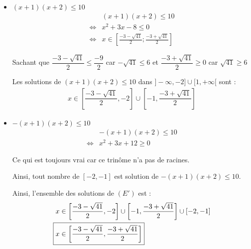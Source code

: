 \begin{exercice}
\begin{itemize}
    \item $(x+1)(x+2) \leq 10$
    \begin{align*}
        &(x+1)(x+2) \leq 10 \\
        \iff &x^2 + 3x - 8 \leq 0\\
        \iff &x \in \left[\frac{-3 -\sqrt{41}}{2};\frac{-3 +\sqrt{41}}{2} \right]
    \end{align*}
    \par Sachant que $\dfrac{-3 -\sqrt{41}}{2} \leq \dfrac{-9}{2}$ car $-\sqrt{41} \leq 6$ et $\dfrac{-3+\sqrt{41}}{2} \geq 0$ car $\sqrt{41} \geq 6$ 
    \\
    \par Les solutions de $(x+1)(x+2) \leq 10$ dans $]-\infty,-2]\cup[1,+\infty[$ sont :
    \begin{align*}
        x \in \left[\dfrac{-3 - \sqrt{41}}{2},-2 \right]\cup \left[-1,\dfrac{-3 + \sqrt{41}}{2}\right]
    \end{align*}
    \item $-(x+1)(x+2) \leq 10$ 
    \begin{align*}
        &-(x+1)(x+2) \leq 10 \\
        \iff &x^2 + 3x + 12 \geq 0
    \end{align*}
    \par Ce qui est toujours vrai car ce trinôme n'a pas de racines.
    \par Ainsi, tout nombre de $[-2,-1]$ est solution de $-(x+1)(x+2) \leq 10$.
    \par Ainsi, l'ensemble des solutions de $(E')$ est :
    \begin{align*}
        &x \in \left[\frac{-3 - \sqrt{41}}{2}, -2\right] \cup \left[-1, \frac{-3 + \sqrt{41}}{2}\right]\cup \left[-2,-1\right] \\
        \Aboxed{&x \in \left[\frac{-3 - \sqrt{41}}{2}, \frac{-3 + \sqrt{41}}{2} \right]}
    \end{align*}
\end{itemize}
\end{exercice}


